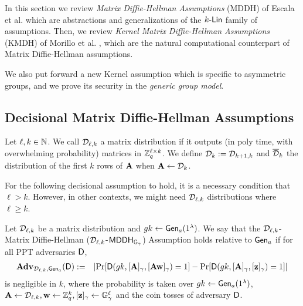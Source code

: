 In this section we review \emph{Matrix Diffie-Hellman Assumptions} (MDDH) of Escala et al. \cite{C:EHKRV13} which are abstractions and generalizations of the $k\mbox{-}\mathsf{Lin}$ family of assumptions. Then, we review \emph{Kernel Matrix Diffie-Hellman Assumptions} (KMDH) of Morillo et al. \cite{EPRINT:MorRafVil15}, which are the natural computational counterpart of Matrix Diffie-Hellman assumptions.

We also put forward a new Kernel assumption which is specific to asymmetric groups, and we prove its security in the \emph{generic group model}.

\subsection{Decisional Matrix Diffie-Hellman Assumptions}
\begin{definition}   \label{def:matrixdef}
Let $\ell,k \in \mathbb{N}$.
We call $\mathcal{D}_{\ell,k}$ a matrix distribution if it outputs (in poly time, with overwhelming probability) matrices in $\mathbb{Z}_q^{\ell \times k}$. We define $\mathcal{D}_k := \mathcal{D}_{k+1,k}$ and $\overline{\mathcal{D}}_{k}$ the distribution of the first $k$ rows of $\mathbf{{A}}$ when $\mathbf{{A}}\gets\mathcal{D}_{k}$. 
\end{definition}

For the following decisional assumption to hold, it is a necessary condition that $\ell>k$. However, in other contexts, we might need $\mathcal{D}_{\ell,k}$ distributions where 
$\ell \geq k$. 

\begin{definition}\label{def:mdh}
Let $\mathcal{D}_{\ell,k}$ be a matrix distribution  and ${gk}\gets \mathsf{Gen}_a(1^\lambda)$. We say that the $\mathcal{D}_{\ell,k}$-Matrix Diffie-Hellman ($\mathcal{D}_{\ell,k}$-$\mathsf{MDDH}_{\mathbb{G}_\gamma}$)
Assumption holds relative to $\mathsf{Gen}_a$ if for all PPT adversaries $\mathsf{D}$,
\begin{eqnarray*}
\mathbf{Adv}_{\mathcal{D}_{\ell,k},\mathsf{Gen}_a}(\mathsf{D}) & := &
    \left|
        \Pr[\mathsf{D}({gk},[\mathbf{{A}}]_\gamma,[\mathbf{{A}}\mathbf{w}]_\gamma)=1]-
        \Pr[\mathsf{D}({gk},[\mathbf{{A}}]_\gamma, [\mathbf{z}]_\gamma) =1]
    \right|
\end{eqnarray*}
is negligible in $k$,
where the probability is taken over ${gk} \gets \mathsf{Gen}_a(1^\lambda)$, $\mathbf{{A}} \gets \mathcal{D}_{\ell,k}, \mathbf{w} \gets \mathbb{Z}_q^k, [\mathbf{z}]_\gamma  \gets \mathbb{G}_\gamma^{\ell}$ and the coin tosses of adversary $\mathsf{D}$.
\end{definition}
 
